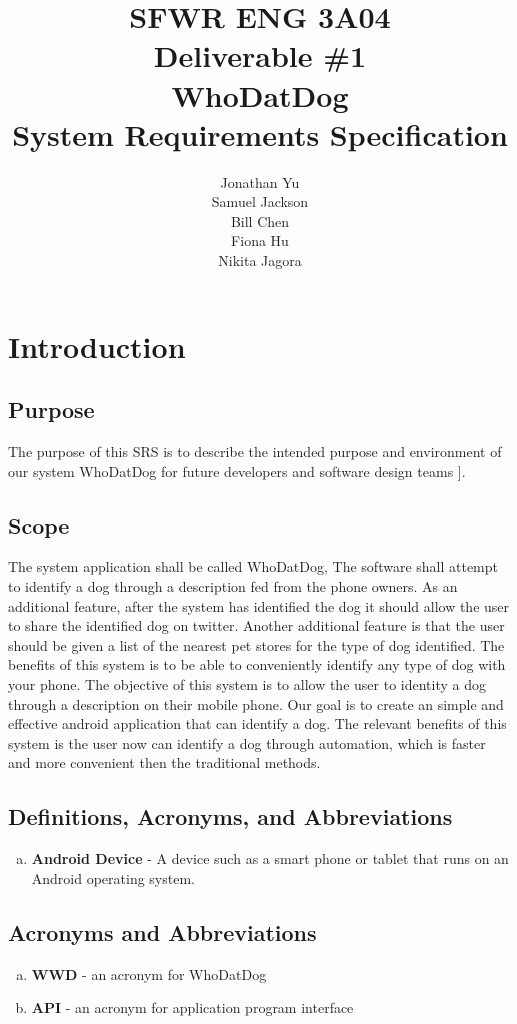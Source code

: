 \documentclass[]{article}
\title{SFWR ENG 3A04\\Deliverable \#1\\WhoDatDog\\ System Requirements Specification}
\author{Jonathan Yu\\Samuel Jackson\\Bill Chen\\Fiona Hu\\Nikita Jagora}
\date{}
\begin{document}
\maketitle	

\section{Introduction}
\label{sec:introduction}
\subsection{Purpose}

The purpose of this SRS is to describe the intended purpose and environment of our system WhoDatDog for future developers and software design teams
]. 


\subsection{Scope}
\label{sub:scope}
The system application shall be called WhoDatDog, The software shall attempt to identify a dog through a description fed from the phone owners. As an additional feature, after the system has identified the dog it should allow the user to share the identified dog on twitter. Another additional feature is that the user should be given a list of the nearest pet stores for the type of dog identified. The benefits of this system is to be able to conveniently identify any type of dog with your phone. The objective of this system is to allow the user to identity a dog through a description on their mobile phone. Our goal is to create an simple and effective android application that can identify a dog. The relevant benefits of this system is the user now can identify a dog through automation, which is faster and more convenient then the traditional methods.   

\subsection{Definitions, Acronyms, and Abbreviations}
\label{sub:definitions_acronyms_and_abbreviations}
\begin{enumerate}[a)]
	\item \textbf{Android Device} - A device such as a smart phone or tablet that runs on an Android operating system.
\end{enumerate}

\subsection{Acronyms and Abbreviations}
\begin{enumerate}[a)]
	\item \textbf{WWD} - an acronym for WhoDatDog
	\item \textbf{API} - an acronym for application program interface
\end{enumerate}
\end{document}
